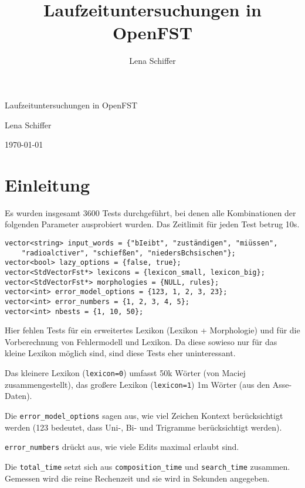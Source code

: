 \documentclass[12pt]{article}
\begin{document}
\title{Laufzeituntersuchungen in OpenFST}
\author{Lena Schiffer}

\begin{center}

\LARGE Laufzeituntersuchungen in OpenFST


\large Lena Schiffer

\large \today

\end{center}

\normalsize

\section{Einleitung}

Es wurden insgesamt 3600 Tests durchgeführt, bei denen alle Kombinationen
der folgenden Parameter ausprobiert wurden.
Das Zeitlimit für jeden Test betrug 10s.

\begin{verbatim}
vector<string> input_words = {"bIeibt", "zuständigen", "miüssen",
    "radioalctiver", "schiefßen", "niedersBchsischen"};
vector<bool> lazy_options = {false, true};
vector<StdVectorFst*> lexicons = {lexicon_small, lexicon_big};
vector<StdVectorFst*> morphologies = {NULL, rules};
vector<int> error_model_options = {123, 1, 2, 3, 23};
vector<int> error_numbers = {1, 2, 3, 4, 5};
vector<int> nbests = {1, 10, 50};
\end{verbatim}

Hier fehlen Tests für ein erweitertes Lexikon (Lexikon + Morphologie) und
für die Vorberechnung von Fehlermodell und Lexikon. Da diese sowieso nur
für das kleine Lexikon möglich sind, sind diese Tests eher uninteressant.

Das kleinere Lexikon (\verb+lexicon=0+) umfasst 50k Wörter (von Maciej zusammengestellt), das
großere Lexikon (\verb+lexicon=1+) 1m Wörter (aus den Asse-Daten).

Die \verb+error_model_options+ sagen aus, wie viel Zeichen Kontext
berücksichtigt werden (123 bedeutet, dass Uni-, Bi- und Trigramme
berücksichtigt werden).

\verb+error_numbers+ drückt aus, wie viele Edits maximal erlaubt sind.

Die \verb+total_time+ setzt sich aus \verb+composition_time+ und
\verb+search_time+ zusammen.
Gemessen wird die reine Rechenzeit und sie wird in Sekunden angegeben.
\end{document}
